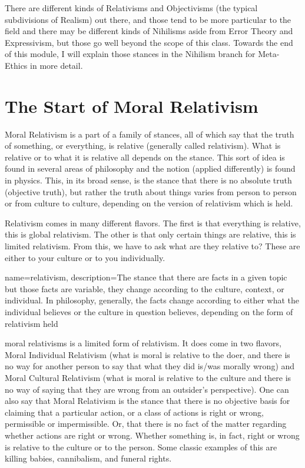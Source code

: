 There are different kinds of Relativisms and Objectivisms (the typical subdivisions of Realism) out there, and those tend to be more particular to the field and there may be different kinds of Nihilisms aside from Error Theory and Expressivism, but those go well beyond the scope of this class. Towards the end of this module, I will explain those stances in the Nihilism branch for Meta-Ethics in more detail.

\section{The Start of Moral Relativism}

Moral Relativism is a part of a family of stances, all of which say that the truth of something, or everything, is relative (generally called \Gls{relativism}). What is relative or to what it is relative all depends on the stance. This sort of idea is found in several areas of philosophy and the notion (applied differently) is found in physics. This, in its broad sense, is the stance that there is no absolute truth (objective truth), but rather the truth about things varies from person to person or from culture to culture, depending on the version of relativism which is held.

Relativism comes in many different flavors. The first is that everything is relative, this is global relativism. The other is that only certain things are relative, this is limited relativism. From this, we have to ask what are they relative to? These are either to your culture or to you individually.

{
  name=relativism,
  description={The stance that there are facts in a given topic but those facts are variable, they change according to the culture, context, or individual. In philosophy, generally, the facts change according to either what the individual believes or the culture in question believes, depending on the form of relativism held}
}


\glspl{moral relativism} is a limited form of relativism. It does come in two flavors, Moral Individual Relativism (what is moral is relative to the doer, and there is no way for another person to say that what they did is/was morally wrong) and Moral Cultural Relativism (what is moral is relative to the culture and there is no way of saying that they are wrong from an outsider's perspective). One can also say that Moral Relativism is the stance that there is no objective basis for claiming that a particular action, or a class of actions is right or wrong, permissible or impermissible. Or, that there is no fact of the matter regarding whether actions are right or wrong. Whether something is, in fact, right or wrong is relative to the culture or to the person. Some classic examples of this are killing babies, cannibalism, and funeral rights.

